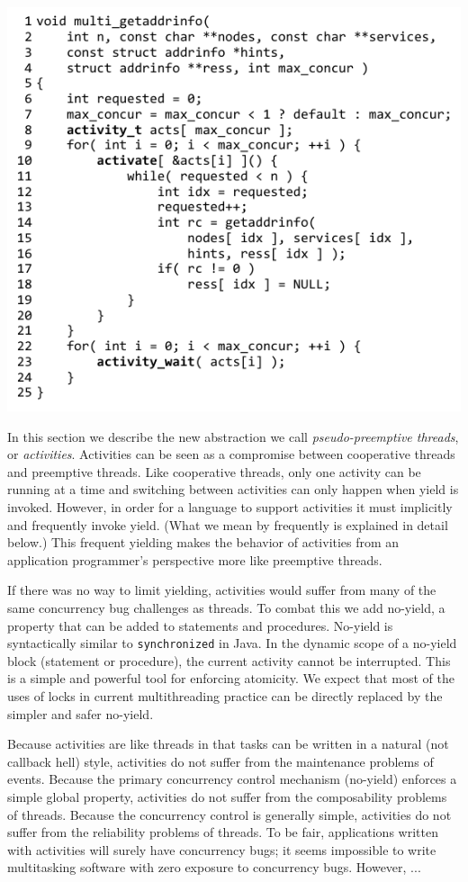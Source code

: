 \documentclass[10pt,preprint]{sigplanconf}
\begin{document}
\hspace{-0.5cm}
\includegraphics{multi_getaddrinfo.pdf}

In this section we describe the new abstraction we call \emph{pseudo-preemptive threads}, or \emph{activities}.
Activities can be seen as a compromise between cooperative threads and preemptive threads.
Like cooperative threads, only one activity can be running at a time and switching between activities can only happen when yield is invoked.
However, in order for a language to support activities it must implicitly and frequently invoke yield.
(What we mean by frequently is explained in detail below.)
This frequent yielding makes the behavior of activities from an application programmer's perspective more like preemptive threads.

If there was no way to limit yielding, activities would suffer from many of the same concurrency bug challenges as threads.
To combat this we add no-yield, a property that can be added to statements and procedures.
No-yield is syntactically similar to \texttt{synchronized} in Java.
In the dynamic scope of a no-yield block (statement or procedure), the current activity cannot be interrupted.
This is a simple and powerful tool for enforcing atomicity.
We expect that most of the uses of locks in current multithreading practice can be directly replaced by the simpler and safer no-yield.

Because activities are like threads in that tasks can be written in a natural (not callback hell) style, activities do not suffer from the maintenance problems of events.
Because the primary concurrency control mechanism (no-yield) enforces a simple global property, activities do not suffer from the composability problems of threads.
Because the concurrency control is generally simple, activities do not suffer from the reliability problems of threads.
To be fair, applications written with activities will surely have concurrency bugs; it seems impossible to write multitasking software with zero exposure to concurrency bugs.
However, ...
\end{document}

